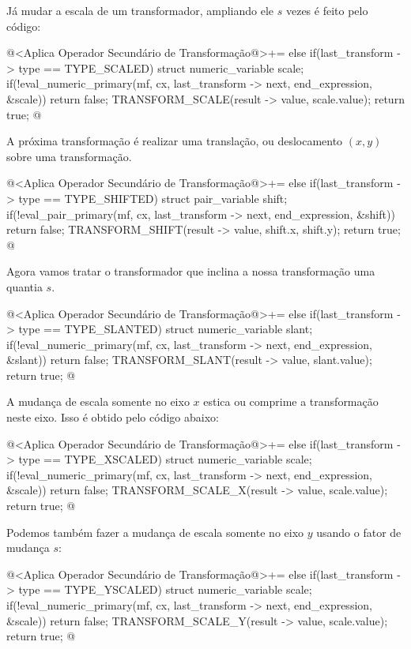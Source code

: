 Já mudar a escala de um transformador, ampliando ele $s$ vezes é feito
pelo código:

\iniciocodigo
@<Aplica Operador Secundário de Transformação@>+=
else if(last_transform -> type == TYPE_SCALED){
  struct numeric_variable scale;
  if(!eval_numeric_primary(mf, cx, last_transform -> next, end_expression,
                           &scale))
    return false;
  TRANSFORM_SCALE(result -> value, scale.value);
  return true;
}
@
\fimcodigo

A próxima transformação é realizar uma translação, ou deslocamento
$(x, y)$ sobre uma transformação.

\iniciocodigo
@<Aplica Operador Secundário de Transformação@>+=
else if(last_transform -> type == TYPE_SHIFTED){
  struct pair_variable shift;
  if(!eval_pair_primary(mf, cx, last_transform -> next, end_expression,
                        &shift))
    return false;
  TRANSFORM_SHIFT(result -> value, shift.x, shift.y);
  return true;
}
@
\fimcodigo

Agora vamos tratar o transformador que inclina a nossa transformação
uma quantia $s$.

\iniciocodigo
@<Aplica Operador Secundário de Transformação@>+=
else if(last_transform -> type == TYPE_SLANTED){
  struct numeric_variable slant;
  if(!eval_numeric_primary(mf, cx, last_transform -> next, end_expression,
                        &slant))
    return false;
  TRANSFORM_SLANT(result -> value, slant.value);
  return true;
}
@
\fimcodigo

A mudança de escala somente no eixo $x$ estica ou comprime a
transformação neste eixo. Isso é obtido pelo código abaixo:

\iniciocodigo
@<Aplica Operador Secundário de Transformação@>+=
else if(last_transform -> type == TYPE_XSCALED){
  struct numeric_variable scale;
  if(!eval_numeric_primary(mf, cx, last_transform -> next, end_expression,
                        &scale))
    return false;
  TRANSFORM_SCALE_X(result -> value, scale.value);
  return true;
}
@
\fimcodigo

Podemos também fazer a mudança de escala somente no eixo $y$ usando o
fator de mudança $s$:

\iniciocodigo
@<Aplica Operador Secundário de Transformação@>+=
else if(last_transform -> type == TYPE_YSCALED){
  struct numeric_variable scale;
  if(!eval_numeric_primary(mf, cx, last_transform -> next, end_expression,
                        &scale))
    return false;
  TRANSFORM_SCALE_Y(result -> value, scale.value);
  return true;
}
@
\fimcodigo

